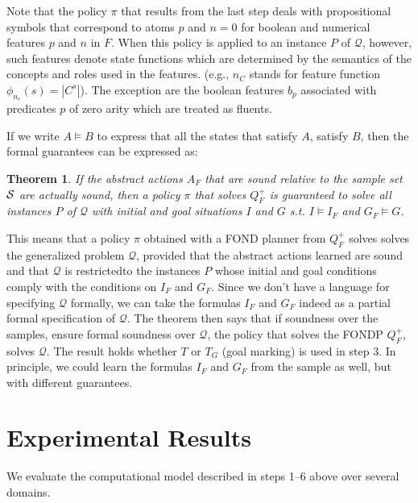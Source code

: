 \documentclass[letterpaper]{article} %
\newtheorem{theorem}[definition]{Theorem}
\newcommand{\Q}{\mathcal{Q}}
\begin{document}
Note that the  policy $\pi$ that results from the last step  deals with propositional symbols
that correspond to atoms $p$ and $n=0$ for boolean and numerical features $p$ and $n$ in $F$. 
When this policy is applied to an instance $P$ of $\Q$, however, such features denote state functions
which are determined by the  semantics of the concepts and roles used in  the features.
(e.g., $n_C$ stands for feature function $\phi_{n_c}(s)=|C^s|$).
The exception are the boolean features $b_p$ associated with
predicates $p$ of zero arity which are treated as fluents.

If we write $A \models B$ to express that all the states that satisfy $A$, satisfy $B$, 
then the formal guarantees can be expressed as:

\begin{theorem}
If the abstract actions $A_F$ that are sound relative to the sample set $\cal S$  are actually sound,
then a   policy $\pi$ that solves  $Q^+_F$  is guaranteed to solve  all instances $P$ of $\Q$
with initial and goal situations $I$ and $G$ s.t. $I \models  I_F$ and $G_F \models G$.
\end{theorem}

This means that a  policy $\pi$ obtained with a FOND planner from $Q^+_F$ 
solves solves the  generalized problem $\Q$, provided that the  abstract
actions learned  are  sound and  that $\Q$ is restrictedto the instances
$P$ whose initial and goal conditions comply with the conditions on $I_F$ and $G_F$.
Since we don't have a language for specifying $\Q$ formally, we can take the formulas
$I_F$ and $G_F$ indeed as a partial formal specification of $\Q$. The theorem then says that
if soundness over the samples, ensure formal soundness over $\Q$, the policy that solves the
FONDP $Q^+_F$, solves $\Q$. The result holds whether $T$ or $T_G$ (goal marking) is used in step 3.
In principle, we could learn the formulas $I_F$ and $G_F$ from the sample as well,  but with different guarantees. 

\section{Experimental Results}

We evaluate the computational model described in steps 1--6 above over several domains.
%
\end{document}
